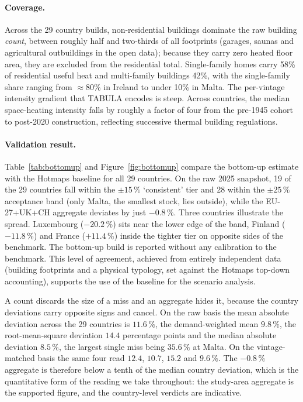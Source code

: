 \paragraph{Coverage.} Across the 29 country builds, non-residential buildings
dominate the raw building \emph{count}, between roughly half and two-thirds of all
footprints (garages, saunas and agricultural outbuildings in the open data);
because they carry zero heated floor area, they are excluded from the residential
total. Single-family homes carry 58\% of residential useful heat and multi-family
buildings 42\%, with the single-family share ranging from $\approx$80\% in Ireland
to under 10\% in Malta. The per-vintage intensity gradient that TABULA encodes is
steep. Across countries, the median space-heating intensity falls by roughly a
factor of four from the pre-1945 cohort to post-2020 construction, reflecting
successive thermal building regulations.

\paragraph{Validation result.} Table~\ref{tab:bottomup} and Figure~\ref{fig:bottomup}
compare the bottom-up estimate with the Hotmaps baseline for all 29 countries. On the
raw 2025 snapshot, 19 of the 29 countries fall within the $\pm 15\,\%$ `consistent' tier
and 28 within the $\pm 25\,\%$ acceptance band (only Malta, the smallest stock, lies
outside), while the EU-27+UK+CH aggregate deviates by just $-0.8\,\%$. Three countries
illustrate the spread. Luxembourg ($-20.2\,\%$) sits near the lower edge of the band,
Finland ($-11.8\,\%$) and France ($+11.4\,\%$) inside the tighter tier on opposite sides
of the benchmark. The bottom-up build is reported without any calibration to the
benchmark. This level of agreement, achieved from entirely independent data (building
footprints and a physical typology, set against the Hotmaps top-down accounting),
supports the use of the baseline for the scenario analysis.

A count discards the size of a miss and an aggregate hides it, because the country
deviations carry opposite signs and cancel. On the raw basis the mean absolute deviation
across the 29 countries is $11.6\,\%$, the demand-weighted mean $9.8\,\%$, the
root-mean-square deviation $14.4$ percentage points and the median absolute deviation
$8.5\,\%$, the largest single miss being $35.6\,\%$ at Malta. On the vintage-matched
basis the same four read $12.4$, $10.7$, $15.2$ and $9.6\,\%$. The $-0.8\,\%$ aggregate
is therefore below a tenth of the median country deviation, which is the quantitative
form of the reading we take throughout: the study-area aggregate is the supported
figure, and the country-level verdicts are indicative.

